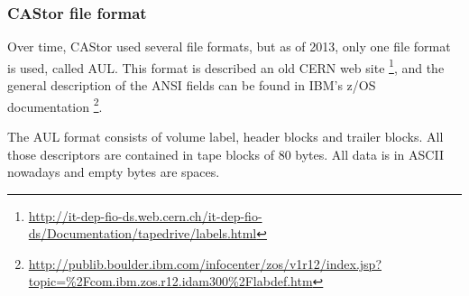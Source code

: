 \subsubsection{CAStor file format}
Over time, CAStor used several file formats, but as of 2013, only one file format
is used, called AUL. This format is described an old CERN web site
\footnote{ \href{http://it-dep-fio-ds.web.cern.ch/it-dep-fio-ds/Documentation/tapedrive/labels.html}{http://it-dep-fio-ds.web.cern.ch/it-dep-fio-ds/Documentation/tapedrive/labels.html} },
and the general description of the ANSI fields can be found in IBM's z/OS documentation
\footnote{ \href{http://publib.boulder.ibm.com/infocenter/zos/v1r12/index.jsp?topic=\%2Fcom.ibm.zos.r12.idam300\%2Flabdef.htm}{http://publib.boulder.ibm.com/infocenter/zos/v1r12/index.jsp?topic=\%2Fcom.ibm.zos.r12.idam300\%2Flabdef.htm} }.

The AUL format consists of volume label, header blocks and trailer blocks. All those
descriptors are contained in tape blocks of 80 bytes. All data is in ASCII nowadays and empty bytes are spaces.


